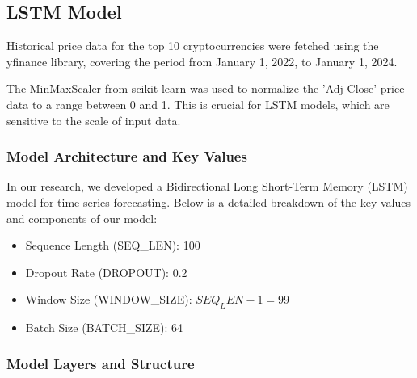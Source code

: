 \pagebreak
\subsection{LSTM Model}

Historical price data for the top 10 cryptocurrencies were fetched using the yfinance\cite{yfinance} library, covering the period from January 1, 2022, to January 1, 2024.

The MinMaxScaler from scikit-learn\cite{scikit-learn} was used to normalize the 'Adj Close' price data to a range between 0 and 1. This is crucial for LSTM models, which are sensitive to the scale of input data.

\subsubsection{Model Architecture and Key Values}

In our research, we developed a Bidirectional Long Short-Term Memory (LSTM) model for time series forecasting. Below is a detailed breakdown of the key values and components of our model:

\begin{itemize}
    \item {Sequence Length (SEQ\_LEN)}: 100
    \item {Dropout Rate (DROPOUT)}: 0.2
    \item {Window Size (WINDOW\_SIZE)}: \(SEQ_LEN - 1 = 99\)
    \item {Batch Size (BATCH\_SIZE)}: 64
\end{itemize}

\subsubsection{Model Layers and Structure}

